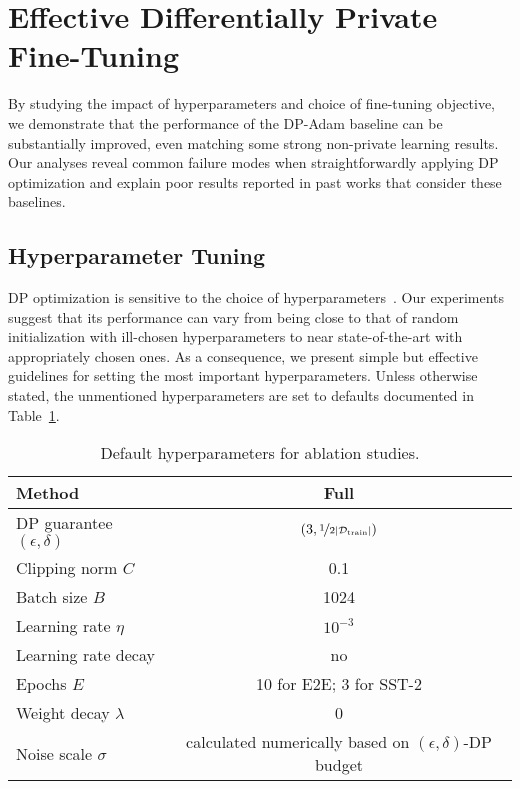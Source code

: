 \section{Effective Differentially Private Fine-Tuning}
By studying the impact of hyperparameters and choice of fine-tuning objective, we demonstrate that the performance of the DP-Adam baseline can be substantially improved, even matching some strong non-private learning results.
Our analyses reveal common failure modes when straightforwardly applying DP optimization and explain poor results reported in past works that consider these baselines.


\subsection{Hyperparameter Tuning}\label{sec:good_hyper_params}
DP optimization is sensitive to the choice of hyperparameters~\citep{papernot2019making}.
Our experiments suggest that its performance can vary from being close to that of random initialization with ill-chosen hyperparameters to near state-of-the-art with appropriately chosen ones. As a consequence, we present simple but effective guidelines for setting the most important hyperparameters.
Unless otherwise stated, the unmentioned hyperparameters are set to defaults documented in Table~\ref{tab:hparams_default}.

\begin{table}[H]
	\centering
	\setlength{\tabcolsep}{7pt}
	\renewcommand{\arraystretch}{1.2}
	\caption{Default hyperparameters for ablation studies. }
	\begin{tabular}{@{} l c @{}}
		\toprule
		Method & Full \\
		\midrule
		DP guarantee $(\epsilon, \delta)$ &
		$(3, \nicefrac{1}{2|\mathcal{D}_{\text{train}}|})$ \\
		Clipping norm $C$ &0.1 \\
		Batch size $B$ & 1024 \\
		Learning rate $\eta$ & $10^{-3}$ \\
		Learning rate decay & no \\
        Epochs $E$ & 10 for E2E; 3 for SST-2 \\
		Weight decay $\lambda$ & 0 \\
		Noise scale $\sigma$ & 
		\multicolumn{1}{c}{calculated numerically based on $(\epsilon, \delta)$-DP budget} \\
		\bottomrule
    	\end{tabular}
		\label{tab:hparams_default}
\end{table}

